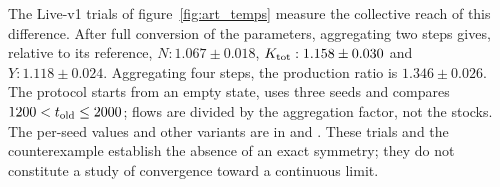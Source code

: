 The Live-v1 trials of figure~\ref{fig:art_temps} measure the collective
reach of this difference. After full conversion of the parameters,
aggregating two steps gives, relative to its reference,
$N:1.067\pm0.018$, $K_{\rm tot}:1.158\pm0.030$ and
$Y:1.118\pm0.024$. Aggregating four steps, the production ratio
is $1.346\pm0.026$. The protocol starts from an empty state,
uses three seeds and compares $1200<t_{\rm old}\le2000$;
flows are divided by the aggregation factor, not the stocks.
The per-seed values and other variants are in
 and
. These trials and the counterexample
establish the absence of an exact symmetry; they do not constitute
a study of convergence toward a continuous limit.
